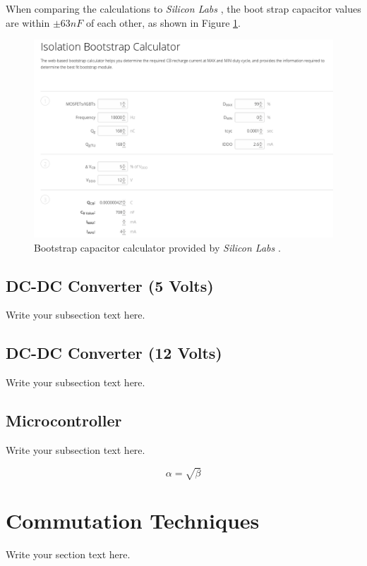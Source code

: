 \documentclass{article}
\begin{document}
		\noindent When comparing the calculations to \textit{Silicon Labs} \cite{silabs}, the boot strap capacitor values are within $\pm 63nF$ of each other, as shown in Figure \ref{fig:silabsCalc}.
	
		\begin{figure}[h!]
			\begin{center}
				\includegraphics[scale=0.3]{silabs_bootstrap_cap}
			\end{center}
			\caption{Bootstrap capacitor calculator provided by \textit{Silicon Labs} \cite{silabs}.}
			\label{fig:silabsCalc}
		\end{figure}
	
		\subsection{DC-DC Converter (5 Volts)}
		Write your subsection text here.
	
		\subsection{DC-DC Converter (12 Volts)}
		Write your subsection text here.
	
		\subsection{Microcontroller}
		Write your subsection text here.
	
		\begin{equation}
		\label{simple_equation}
		\alpha = \sqrt{ \beta }
		\end{equation}
	
	\section{Commutation Techniques}
	Write your section text here.
	
\end{document}
